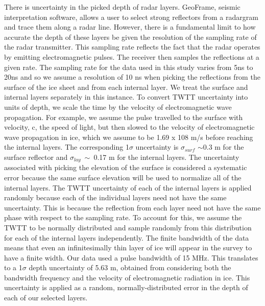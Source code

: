 \documentclass[jgrga]{agutex}
\begin{document}
\begin{article}

There is uncertainty in the picked depth of radar layers.  GeoFrame, seismic interpretation software, allows a user to select strong reflectors from a radargram and trace them along a radar line. However, there is a fundamental limit to how accurate the depth of these layers be given the resolution of the sampling rate of the radar transmitter. This sampling rate reflects the fact that the radar operates by emitting electromagnetic pulses. The receiver then samples the reflections at a given rate. The sampling rate for the data used in this study varies from 5ns to 20ns and so we assume a resolution of 10 ns when picking the reflections from the surface of the ice sheet and from each internal layer. We treat the surface and internal layers separately in this instance. 
	To convert TWTT uncertainty into units of depth, we scale the time by the velocity of electromagnetic wave propagation. For example, we assume the pulse travelled to the surface with velocity, c, the speed of light, but then slowed to the velocity of electromagnetic wave propagation in ice, which we assume to be 1.69 x 108 m/s before reaching the internal layers. The corresponding 1$\sigma$ uncertainty is $\sigma_{surf}$ $\sim$0.3 m for the surface reflector and $\sigma_{lay}~\sim~$0.17 m for the internal layers.  
The uncertainty associated with picking the elevation of the surface is considered a systematic error because the same surface elevation will be used to normalize all of the internal layers. The TWTT uncertainty of each of the internal layers is applied randomly because each of the individual layers need not have the same uncertainty. This is because the reflection from each layer need not have the same phase with respect to the sampling rate. To account for this, we assume the TWTT to be normally distributed and sample randomly from this distribution for each of the internal layers independently.
	The finite bandwidth of the data means that even an infinitesimally thin layer of ice will appear in the survey to have a finite width. Our data used a pulse bandwidth of 15 MHz. This translates to a 1$\sigma$ depth uncertainty of 5.63 m, obtained from considering both the bandwidth frequency and the velocity of electromagnetic radiation in ice. This uncertainty is applied as a random, normally-distributed error in the depth of each of our selected layers. 





\end{article}
\end{document}
